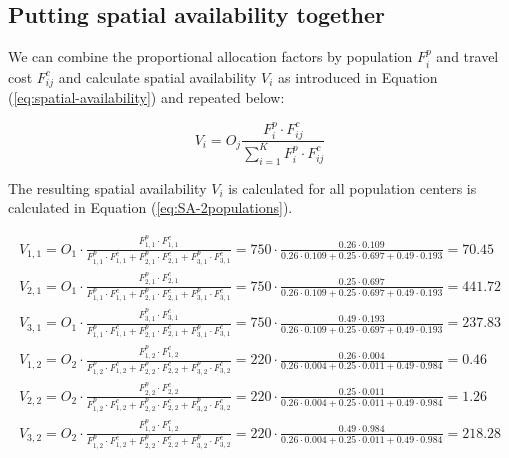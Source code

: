 \documentclass[]{elsarticle} %
\begin{document}
\hypertarget{putting-spatial-availability-together}{%
\subsection{Putting spatial availability
together}\label{putting-spatial-availability-together}}

We can combine the proportional allocation factors by population
\(F^p_{i}\) and travel cost \(F^c_{ij}\) and calculate spatial
availability \(V_{i}\) as introduced in Equation
(\ref{eq:spatial-availability}) and repeated below:

\[
V_{i} = O_j\frac{F^p_{i} \cdot F^c_{ij}}{\sum_{i=1}^K F^p_{i} \cdot F^c_{ij}}
\]

The resulting spatial availability \(V_{i}\) is calculated for all
population centers is calculated in Equation (\ref{eq:SA-2populations}).

\begin{equation}
\label{eq:SA-2populations}
\begin{array}{l}

V_{1,1} = O_1\cdot \frac{F^p_{1,1} \cdot F^c_{1,1}}{F^p_{1,1} \cdot F^c_{1,1} + F^p_{2,1} \cdot F^c_{2,1} + F^p_{3,1} \cdot F^c_{3,1}} = 
750 \cdot \frac{0.26 \cdot 0.109}{0.26 \cdot 0.109 + 0.25 \cdot 0.697 + 0.49 \cdot 0.193} = 70.45\\
V_{2,1} = O_1\cdot \frac{F^p_{2,1} \cdot F^c_{2,1}}{F^p_{1,1} \cdot F^c_{1,1} + F^p_{2,1} \cdot F^c_{2,1} + F^p_{3,1} \cdot F^c_{3,1}} = 
750 \cdot \frac{0.25 \cdot 0.697}{0.26 \cdot 0.109 + 0.25 \cdot 0.697 + 0.49 \cdot 0.193} = 441.72\\
V_{3,1} = O_1\cdot \frac{F^p_{3,1} \cdot F^c_{3,1}}{F^p_{1,1} \cdot F^c_{1,1} + F^p_{2,1} \cdot F^c_{2,1} + F^p_{3,1} \cdot F^c_{3,1}} = 
750 \cdot \frac{0.49 \cdot 0.193}{0.26 \cdot 0.109 + 0.25 \cdot 0.697 + 0.49 \cdot 0.193} = 237.83\\

V_{1,2} = O_2\cdot \frac{F^p_{1,2} \cdot F^c_{1,2}}{F^p_{1,2} \cdot F^c_{1,2} + F^p_{2,2} \cdot F^c_{2,2} + F^p_{3,2} \cdot F^c_{3,2}} = 
220 \cdot \frac{0.26 \cdot 0.004}{0.26 \cdot 0.004 + 0.25 \cdot 0.011 + 0.49 \cdot 0.984} = 0.46\\
V_{2,2} = O_2\cdot \frac{F^p_{2,2} \cdot F^c_{2,2}}{F^p_{1,2} \cdot F^c_{1,2} + F^p_{2,2} \cdot F^c_{2,2} + F^p_{3,2} \cdot F^c_{3,2}} = 
220 \cdot \frac{0.25 \cdot 0.011}{0.26 \cdot 0.004 + 0.25 \cdot 0.011 + 0.49 \cdot 0.984} = 1.26\\
V_{3,2} = O_2\cdot \frac{F^p_{1,2} \cdot F^c_{1,2}}{F^p_{1,2} \cdot F^c_{1,2} + F^p_{2,2} \cdot F^c_{2,2} + F^p_{3,2} \cdot F^c_{3,2}} = 
220 \cdot \frac{0.49 \cdot 0.984}{0.26 \cdot 0.004 + 0.25 \cdot 0.011 + 0.49 \cdot 0.984} = 218.28\\
\end{array}
\end{equation}
\end{document}
